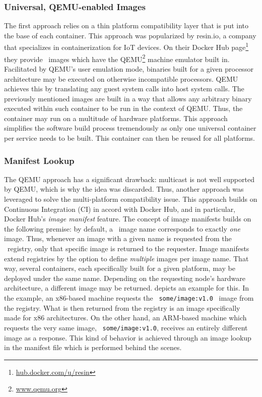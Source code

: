\subsubsection{Universal, QEMU-enabled Images}
The first approach relies on a thin platform compatibility layer that is put into the base of each container. This approach was popularized by resin.io, a company that specializes in containerization for IoT devices. On their Docker Hub page\footnote{\url{hub.docker.com/u/resin}} they provide \docker\ images which have the QEMU\footnote{\url{www.qemu.org}} machine emulator built in. Facilitated by QEMU's user emulation mode, binaries built for a given processor architecture may be executed on otherwise incompatible processors. QEMU achieves this by translating any guest system calls into host system calls. The previously mentioned images are built in a way that allows any arbitrary binary executed within such container to be run in the context of QEMU. Thus, the container may run on a multitude of hardware platforms.
This approach simplifies the software build process tremendously as only one universal container per service needs to be built. This container can then be reused for all platforms.

\subsubsection{Manifest Lookup}
The QEMU approach has a significant drawback: multicast is not well supported by QEMU, which is why the idea was discarded.
Thus, another approach was leveraged to solve the multi-platform compatibility issue. This approach builds on Continuous Integration (CI) in accord with Docker Hub, and in particular, Docker Hub's \emph{image manifest} feature. The concept of image manifests builds on the following premise: by default, a \docker\ image name corresponds to exactly \emph{one} image. Thus, whenever an image with a given name is requested from the \docker\ registry, only that specific image is returned to the requester. Image manifests extend registries by the option to define \emph{multiple} images per image name. That way, several containers, each specifically built for a given platform, may be deployed under the same name. Depending on the requesting node's hardware architecture, a different image may be returned.  depicts an example for this. In the example, an x86-based machine requests the \ \mbox{\texttt{some/image:v1.0}} \ image from the registry. What is then returned from the registry is an image specifically made for x86 architectures. On the other hand, an ARM-based machine which requests the very same image, \ \mbox{\texttt{some/image:v1.0}}, receives an entirely different image as a response. This kind of behavior is achieved through an image lookup in the manifest file which is performed behind the scenes.


